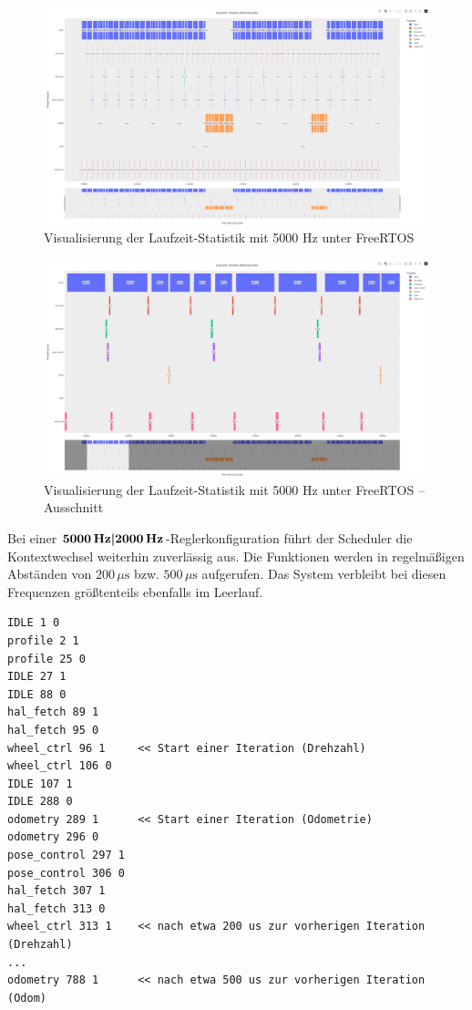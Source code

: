 \begin{figure}[H]
    \centering
    \includegraphics[width=1\textwidth]{assets/freertos_profiling_5000hz}
    \caption{Visualisierung der Laufzeit-Statistik mit 5000 Hz unter FreeRTOS}
\end{figure}
\begin{figure}[H]
    \centering
    \includegraphics[width=1\textwidth]{assets/freertos_profiling_5000hz_ausschnitt}
    \caption{Visualisierung der Laufzeit-Statistik mit 5000 Hz unter FreeRTOS --
    Ausschnitt}
\end{figure}

Bei einer $\textbf{5000\,\text{Hz}|2000\,\text{Hz}}$-Reglerkonfiguration führt
der Scheduler die Kontextwechsel weiterhin zuverlässig aus. Die Funktionen
werden in regelmäßigen Abständen von $200\,\mu\text{s}$ bzw. $500\,\mu\text{s}$
aufgerufen. Das System verbleibt bei diesen Frequenzen größtenteils ebenfalls im
Leerlauf.

\begin{code}
\begin{verbatim}
IDLE 1 0
profile 2 1
profile 25 0
IDLE 27 1
IDLE 88 0
hal_fetch 89 1
hal_fetch 95 0
wheel_ctrl 96 1     << Start einer Iteration (Drehzahl)
wheel_ctrl 106 0
IDLE 107 1
IDLE 288 0
odometry 289 1      << Start einer Iteration (Odometrie)
odometry 296 0
pose_control 297 1
pose_control 306 0
hal_fetch 307 1
hal_fetch 313 0
wheel_ctrl 313 1    << nach etwa 200 us zur vorherigen Iteration (Drehzahl)
...
odometry 788 1      << nach etwa 500 us zur vorherigen Iteration (Odom)
\end{verbatim}
\end{code}

